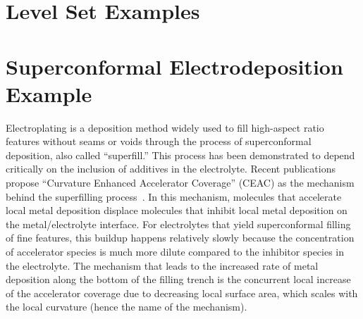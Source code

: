 \documentclass[tocAsPDFpart]{fipy}
\begin{document}



% 
% 
% 
% 



% 



\chapter{Level Set Examples}


% 

% 



\chapter{Superconformal Electrodeposition Example}

Electroplating is a deposition method widely used to fill high-aspect
ratio features without seams or voids through the process of
superconformal deposition, also called ``superfill.''  This process
has been demonstrated to depend critically on the inclusion of
additives in the electrolyte.  Recent publications propose ``Curvature
Enhanced Accelerator Coverage'' (CEAC) as the mechanism behind the
superfilling process~\cite{NIST:damascene:2001}.  In this mechanism,
molecules that accelerate local metal deposition displace molecules
that inhibit local metal deposition on the metal/electrolyte
interface. For electrolytes that yield superconformal filling of fine
features, this buildup happens relatively slowly because the
concentration of accelerator species is much more dilute compared to
the inhibitor species in the electrolyte.  The mechanism that leads to
the increased rate of metal deposition along the bottom of the filling
trench is the concurrent local increase of the accelerator coverage
due to decreasing local surface area, which scales with the local
curvature (hence the name of the mechanism).
\end{document}
